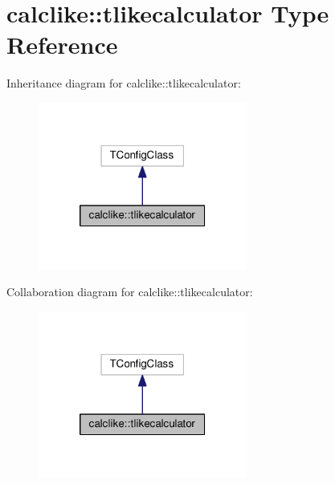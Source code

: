 \hypertarget{structcalclike_1_1tlikecalculator}{}\section{calclike\+:\+:tlikecalculator Type Reference}
\label{structcalclike_1_1tlikecalculator}


Inheritance diagram for calclike\+:\+:tlikecalculator\+:
\nopagebreak
\begin{figure}[H]
\begin{center}
\leavevmode
\includegraphics[width=194pt]{structcalclike_1_1tlikecalculator__inherit__graph}
\end{center}
\end{figure}


Collaboration diagram for calclike\+:\+:tlikecalculator\+:
\nopagebreak
\begin{figure}[H]
\begin{center}
\leavevmode
\includegraphics[width=194pt]{structcalclike_1_1tlikecalculator__coll__graph}
\end{center}
\end{figure}
